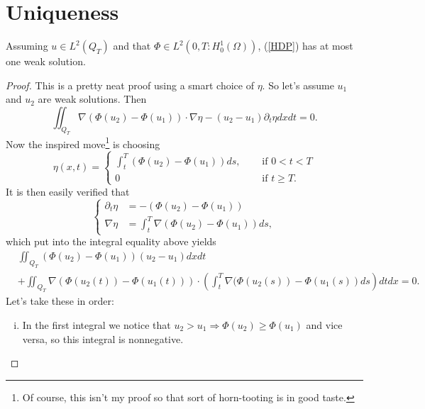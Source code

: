 \documentclass[11pt, a4paper]{article}
\begin{document}
\section{Uniqueness}
\begin{theorem}[Uniqueness]
	Assuming $u \in L^2(Q_T)$ and that $\Phi \in L^2(0,T : H_0^1(\Omega))$, (\ref{HDP}) has at most one weak solution.
\end{theorem}
\begin{proof}
This is a pretty neat proof using a smart choice of $\eta$. So let's assume $u_1$ and $u_2$ are weak solutions. Then
\begin{equation*}
\iint_{Q_T}\nabla(\Phi(u_2) - \Phi(u_1)) \cdot \nabla \eta - (u_2 - u_1)\partial_t \eta dxdt = 0.
\end{equation*}
Now the inspired move\footnote{Of course, this isn't my proof so that sort of horn-tooting is in good taste.} is choosing
\begin{equation*}
\eta(x,t) = \begin{cases}
		\int_t^T(\Phi(u_2) - \Phi(u_1))ds, \quad &\text{ if } 0 < t < T \\
		0 \quad &\text{ if } t\geq T.
	\end{cases}
\end{equation*}
It is then easily verified that
\begin{equation*}
\begin{cases}
	\partial_t \eta &= -(\Phi(u_2) - \Phi(u_1) ) \\
	\nabla \eta &= \int_t^T\nabla (\Phi(u_2) - \Phi(u_1))ds,
\end{cases}
\end{equation*}
which put into the integral equality above yields
\begin{equation}
\label{unique}
\begin{aligned}
	&\iint_{Q_T}(\Phi(u_2) - \Phi(u_1))(u_2 - u_1)dxdt \\ 
	&+ \iint_{Q_T}\nabla(\Phi(u_2(t)) - \Phi(u_1(t))) \cdot \left(\int_t^T 					\nabla(\Phi(u_2(s)) - \Phi(u_1(s))ds\right)dtdx = 0.
\end{aligned}
\end{equation}
Let's take these in order:
\begin{enumerate}[i)]
	\item In the first integral we notice that $u_2 > u_1 \Rightarrow \Phi(u_2) \geq \Phi(u_1)$ and vice versa, so this integral is nonnegative.
	

\end{enumerate}
\end{proof}
\end{document}
